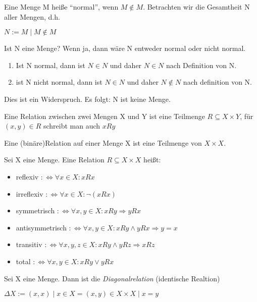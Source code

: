 \documentclass{../../meta/tudscript}
\begin{document}

Eine Menge M heiße ``normal'', wenn \(M \notin M\). Betrachten wir die
Gesamtheit N aller Mengen, d.h.

\(N := {M \mid M \notin M}\)

Ist N eine Menge? Wenn ja, dann wäre N entweder normal oder nicht
normal.

\begin{enumerate}
\def\labelenumi{\arabic{enumi}.}

\item
  Ist N normal, dann ist \(N \in N\) und daher \(N \in N\) nach
  Definition von N.
\item
  ist N nicht normal, dann ist \(N \in N\) und daher \(N \notin N\) nach
  definition von N.
\end{enumerate}

Dies ist ein Widerspruch. Es folgt: N ist keine Menge.



Eine Relation zwischen zwei Mengen X und Y ist eine Teilmenge
\(R \subseteq X \times Y\), für \((x,y) \in R\) schreibt man auch
\(xRy\)

Eine (binäre)Relation auf einer Menge X ist eine Teilmenge von
\(X \times X\).


Sei X eine Menge. Eine Relation \(R \subseteq X \times X\) heißt: 
\begin{itemize}
	\item
		reflexiv \(: \iff \forall x \in X: xRx\) 
	\item
		irreflexiv \(: \iff \forall x \in X: \neg (xRx)\) 
	\item	symmetrisch \(: \iff \forall x, y \in X: xRy \Rightarrow yRx\) 
	\item	antisymmetrisch \(: \iff \forall x, y \in X: xRy \wedge yRx \Rightarrow y = x\) 
	\item	transitiv \(: \iff \forall x, y, z \in X: xRy \wedge yRz \Rightarrow xRz\) 
	\item 	total \(: \iff \forall x, y \in X: xRy \vee yRx\)
\end{itemize}


Sei X eine Menge. Dann ist die \emph{Diagonalrelation} (identische
Realtion)

\(\Delta X := {(x,x) \mid x \in X} = {(x,y) \in X \times X \mid x = y}\)
\end{document}
